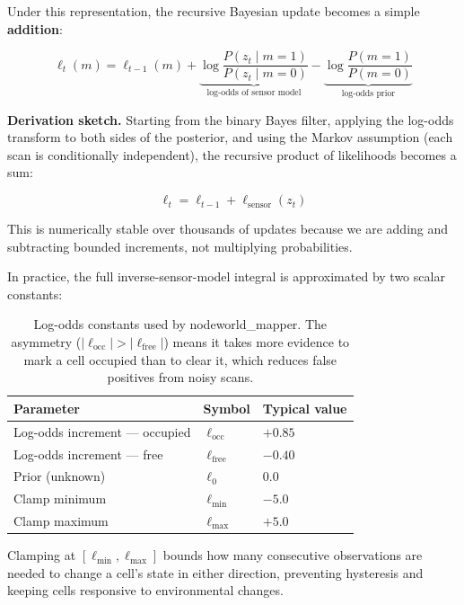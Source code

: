 \documentclass[conference]{IEEEtran}
\begin{document}
Under this representation, the recursive Bayesian update becomes a simple \textbf{addition}:
 
\begin{equation}
  \ell_t(m) = \ell_{t-1}(m) + \underbrace{\log \frac{P(z_t \mid m=1)}{P(z_t \mid m=0)}}_{\text{log-odds of sensor model}}
               - \underbrace{\log \frac{P(m=1)}{P(m=0)}}_{\text{log-odds prior}}
  \label{eq:update}
\end{equation}
 
\noindent
\textbf{Derivation sketch.} Starting from the binary Bayes filter, applying the log-odds transform to both sides of the posterior, and using the Markov assumption (each scan is conditionally independent), the recursive product of likelihoods becomes a sum:
 
\[
  \ell_t = \ell_{t-1} + \ell_\text{sensor}(z_t)
\]
 
This is numerically stable over thousands of updates because we are adding and subtracting bounded increments, not multiplying probabilities.
 
In practice, the full inverse-sensor-model integral is approximated by two scalar constants:
 
\begin{table}[H]
\centering
\begin{tabular}{lll}
\toprule
Parameter & Symbol & Typical value \\
\midrule
Log-odds increment — occupied & $\ell_\text{occ}$  & $+0.85$  \\
Log-odds increment — free     & $\ell_\text{free}$ & $-0.40$  \\
Prior (unknown)               & $\ell_0$           & $0.0$    \\
Clamp minimum                 & $\ell_\text{min}$  & $-5.0$   \\
Clamp maximum                 & $\ell_\text{max}$  & $+5.0$   \\
\bottomrule
\end{tabular}
\caption{Log-odds constants used by node{world\_mapper}. The asymmetry ($|\ell_\text{occ}| > |\ell_\text{free}|$) means it takes more evidence to mark a cell occupied than to clear it, which reduces false positives from noisy scans.}
\end{table}
 
Clamping at $[\ell_\text{min}, \ell_\text{max}]$ bounds how many consecutive observations are needed to change a cell's state in either direction, preventing hysteresis and keeping cells responsive to environmental changes.
\end{document}
